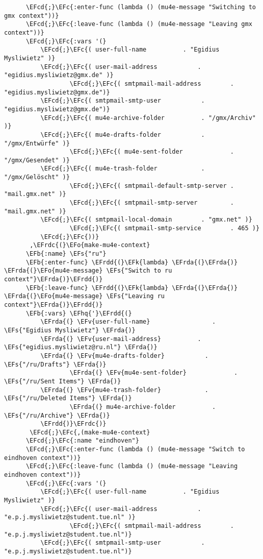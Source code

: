 \documentclass[a4wide,10pt]{article}
\newcommand{\EFc}[1]{\textcolor{EFc}{#1}} %
\newcommand{\EFcd}[1]{\textcolor{EFcd}{#1}} %
\newcommand{\EFs}[1]{\textcolor{EFs}{#1}} %
\newcommand{\EFk}[1]{\textcolor{EFk}{#1}} %
\newcommand{\EFb}[1]{\textcolor{EFb}{#1}} %
\newcommand{\EFv}[1]{\textcolor{EFv}{#1}} %
\newcommand{\EFo}[1]{\textcolor{EFo}{#1}} %
\newcommand{\EFhq}[1]{\textcolor{EFhq}{#1}} %
\newcommand{\EFrda}[1]{\textcolor{EFrda}{#1}} %
\newcommand{\EFrdc}[1]{\textcolor{EFrdc}{#1}} %
\newcommand{\EFrdd}[1]{\textcolor{EFrdd}{#1}} %
\begin{document}
\begin{Code}
\begin{Verbatim}
	  \EFcd{;}\EFc{:enter-func (lambda () (mu4e-message "Switching to gmx context"))}
	  \EFcd{;}\EFc{:leave-func (lambda () (mu4e-message "Leaving gmx context"))}
	  \EFcd{;}\EFc{:vars '(}
		  \EFcd{;}\EFc{( user-full-name	         . "Egidius Mysliwietz" )}
		  \EFcd{;}\EFc{( user-mail-address	         . "egidius.mysliwietz@gmx.de" )}
                  \EFcd{;}\EFc{( smtpmail-mail-address        . "egidius.mysliwietz@gmx.de")}
		  \EFcd{;}\EFc{( smtpmail-smtp-user           . "egidius.mysliwietz@gmx.de")}
		  \EFcd{;}\EFc{( mu4e-archive-folder          . "/gmx/Archiv" )}
		  \EFcd{;}\EFc{( mu4e-drafts-folder           . "/gmx/Entwürfe" )}
                  \EFcd{;}\EFc{( mu4e-sent-folder             . "/gmx/Gesendet" )}
		  \EFcd{;}\EFc{( mu4e-trash-folder            . "/gmx/Gelöscht" )}
                  \EFcd{;}\EFc{( smtpmail-default-smtp-server . "mail.gmx.net" )}
                  \EFcd{;}\EFc{( smtpmail-smtp-server         . "mail.gmx.net" )}
		  \EFcd{;}\EFc{( smtpmail-local-domain        . "gmx.net" )}
                  \EFcd{;}\EFc{( smtpmail-smtp-service        . 465 )}
		  \EFcd{;}\EFc{))}
       ,\EFrdc{(}\EFo{make-mu4e-context}
	  \EFb{:name} \EFs{"ru"}
	  \EFb{:enter-func} \EFrdd{(}\EFk{lambda} \EFrda{(}\EFrda{)} \EFrda{(}\EFo{mu4e-message} \EFs{"Switch to ru context"}\EFrda{)}\EFrdd{)}
	  \EFb{:leave-func} \EFrdd{(}\EFk{lambda} \EFrda{(}\EFrda{)} \EFrda{(}\EFo{mu4e-message} \EFs{"Leaving ru context"}\EFrda{)}\EFrdd{)}
	  \EFb{:vars} \EFhq{'}\EFrdd{(}
		  \EFrda{(} \EFv{user-full-name}	             . \EFs{"Egidius Mysliwietz"} \EFrda{)}
		  \EFrda{(} \EFv{user-mail-address}	         . \EFs{"egidius.mysliwietz@ru.nl"} \EFrda{)}
		  \EFrda{(} \EFv{mu4e-drafts-folder}           . \EFs{"/ru/Drafts"} \EFrda{)}
                  \EFrda{(} \EFv{mu4e-sent-folder}             . \EFs{"/ru/Sent Items"} \EFrda{)}
		  \EFrda{(} \EFv{mu4e-trash-folder}            . \EFs{"/ru/Deleted Items"} \EFrda{)}
          		  \EFrda{(} mu4e-archive-folder          . \EFs{"/ru/Archive"} \EFrda{)}
		  \EFrdd{)}\EFrdc{)}
       \EFcd{;}\EFc{,(make-mu4e-context}
	  \EFcd{;}\EFc{:name "eindhoven"}
	  \EFcd{;}\EFc{:enter-func (lambda () (mu4e-message "Switch to eindhoven context"))}
	  \EFcd{;}\EFc{:leave-func (lambda () (mu4e-message "Leaving eindhoven context"))}
	  \EFcd{;}\EFc{:vars '(}
		  \EFcd{;}\EFc{( user-full-name	         . "Egidius Mysliwietz" )}
		  \EFcd{;}\EFc{( user-mail-address	         . "e.p.j.mysliwietz@student.tue.nl" )}
                  \EFcd{;}\EFc{( smtpmail-mail-address        . "e.p.j.mysliwietz@student.tue.nl")}
		  \EFcd{;}\EFc{( smtpmail-smtp-user           . "e.p.j.mysliwietz@student.tue.nl")}

\end{Verbatim}
\end{Code}
\end{document}
